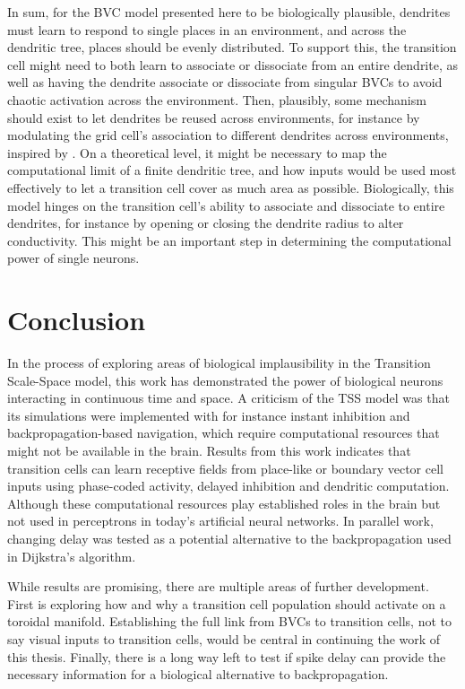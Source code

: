 \documentclass{article}
\begin{document}
    In sum, for the BVC model presented here to be biologically plausible, dendrites must learn to respond to single places in an environment, and across the dendritic tree, places should be evenly distributed. To support this, the transition cell might need to both learn to associate or dissociate from an entire dendrite, as well as having the dendrite associate or dissociate from singular BVCs to avoid chaotic activation across the environment. Then, plausibly, some mechanism should exist to let dendrites be reused across environments, for instance by modulating the grid cell's association to different dendrites across environments, inspired by \parencite{Alabi2022}. 
    On a theoretical level, it might be necessary to map the computational limit of a finite dendritic tree, and how inputs would be used most effectively to let a transition cell cover as much area as possible. Biologically, this model hinges on the transition cell's ability to associate and dissociate to entire dendrites, for instance by opening or closing the dendrite radius to alter conductivity. This might be an important step in determining the computational power of single neurons.

    \newpage
    \section{Conclusion}
    In the process of exploring areas of biological implausibility in the Transition Scale-Space model, this work has demonstrated the power of biological neurons interacting in continuous time and space. A criticism of the TSS model was that its simulations were implemented with for instance instant inhibition and backpropagation-based navigation, which require computational resources that might not be available in the brain. Results from this work indicates that transition cells can learn receptive fields from place-like or boundary vector cell inputs using phase-coded activity, delayed inhibition and dendritic computation. Although these computational resources play established roles in the brain but not used in perceptrons in today's artificial neural networks. In parallel work, changing delay was tested as a potential alternative to the backpropagation used in Dijkstra's algorithm. 
    
    While results are promising, there are multiple areas of further development. First is exploring how and why a transition cell population should activate on a toroidal manifold. Establishing the full link from BVCs to transition cells, not to say visual inputs to transition cells, would be central in continuing the work of this thesis. Finally, there is a long way left to test if spike delay can provide the necessary information for a biological alternative to backpropagation.
\end{document}
